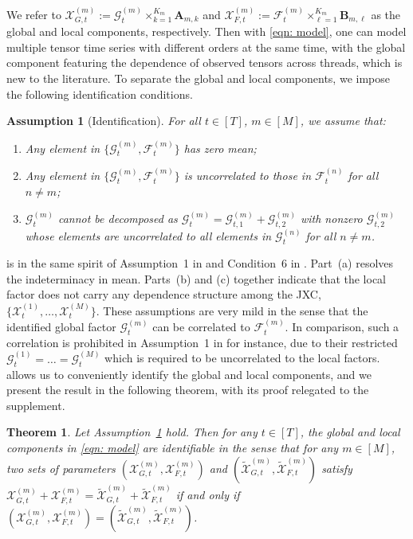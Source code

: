 \documentclass[aos]{imsart}
\theoremstyle{plain}
\newtheorem{theorem}{Theorem}[section]
\newtheorem{assumption}{Assumption}
\theoremstyle{definition}
\def\wt#1{\widetilde{#1}}
\def\cF{\mathcal{F}}
\def\cG{\mathcal{G}} \def\cH{\boldsymbol{\mathcal{H}}} \def\cI{\mathcal{I}}
\def\cX{\mathcal{X}}
\def\bA{\mathbf{A}}
\def\bB{\mathbf{B}}
\begin{document}
We refer to $\cX_{G,t}^{(m)}:= \cG_t^{(m)} \times_{k=1}^{K_m} \bA_{m,k}$ and $\cX_{F,t}^{(m)}:= \cF_t^{(m)} \times_{\ell=1}^{K_m} \bB_{m,\ell}$ as the global and local components, respectively. Then with \eqref{eqn: model}, one can model multiple tensor time series with different orders at the same time, with the global component featuring the dependence of observed tensors across threads, which is new to the literature. To separate the global and local components, we impose the following identification conditions.


\begin{assumption}[Identification]\label{ass: identification}
For all $t\in[T]$, $m\in[M]$, we assume that: 
\begin{enumerate}[itemsep=0pt, label = (\alph*), left = 0pt]
    \item Any element in $\big\{ \cG_t^{(m)}, \cF_t^{(m)} \big\}$ has zero mean;
    \item Any element in $\big\{ \cG_t^{(m)}, \cF_t^{(m)} \big\}$ is uncorrelated to those in $\cF_t^{(n)}$ for all $n\neq m$;
    \item $\cG_t^{(m)}$ cannot be decomposed as $\cG_{t}^{(m)} =\cG_{t,1}^{(m)} + \cG_{t,2}^{(m)}$ with nonzero $\cG_{t,2}^{(m)}$ whose elements are uncorrelated to all elements in $\cG_t^{(n)}$ for all $n\neq m$.
\end{enumerate}
\end{assumption}



 is in the same spirit of Assumption~1 in \cite{Choietal2018} and Condition~6 in \cite{Zhangetal2025}. Part~(a) resolves the indeterminacy in mean. Parts~(b) and (c) together indicate that the local factor does not carry any dependence structure among the JXC, $\{\cX_t^{(1)}, \dots, \cX_t^{(M)} \}$. These assumptions are very mild in the sense that the identified global factor $\cG_t^{(m)}$ can be correlated to $\cF_t^{(m)}$. In comparison, such a correlation is prohibited in Assumption~1 in \cite{Choietal2018} for instance, due to their restricted $\cG_t^{(1)} =\dots= \cG_t^{(M)}$ which is required to be uncorrelated to the local factors.  allows us to conveniently identify the global and local components, and we present the result in the following theorem, with its proof relegated to the supplement.


\begin{theorem}
\label{prop: identification}
Let Assumption~\ref{ass: identification} hold. Then for any $t\in[T]$, the global and local components in \eqref{eqn: model} are identifiable in the sense that for any $m\in[M]$, two sets of parameters $(\cX_{G,t}^{(m)}, \cX_{F,t}^{(m)})$ and $(\wt\cX_{G,t}^{(m)}, \wt\cX_{F,t}^{(m)})$ satisfy $\cX_{G,t}^{(m)} + \cX_{F,t}^{(m)} = \wt\cX_{G,t}^{(m)} + \wt\cX_{F,t}^{(m)}$ if and only if $(\cX_{G,t}^{(m)}, \cX_{F,t}^{(m)}) =(\wt\cX_{G,t}^{(m)}, \wt\cX_{F,t}^{(m)})$.
\end{theorem}
\end{document}
